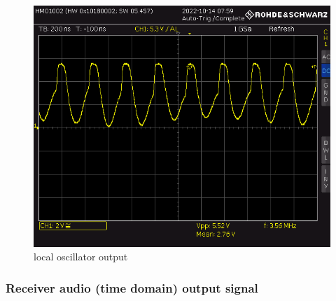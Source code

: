 \documentclass[
11pt, %
a4paper, %
oneside, %
headinclude,footinclude, %
BCOR5mm, %
]{scrartcl}
\begin{document}
\begin{figure}[h!]
    \centering
    \includegraphics[width=0.9\linewidth]{Figures/BUCK06.PNG}
    \caption{local oscillator output}
    \label{fig:local oscillator output}
\end{figure}


\newpage
\subsubsection{Receiver audio (time domain) output signal}
\end{document}
